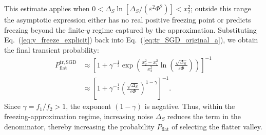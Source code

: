 \documentclass[aps,prx,reprint,superscriptaddress,longbibliography,nofootinbib,floatfix]{revtex4-2}
\begin{document}
This estimate applies when $0<\Delta_S \ln[\Delta_S/(\varepsilon^2\Phi^2)]<x_2^2$; outside this range the asymptotic expression either has no real positive freezing point or predicts freezing beyond the finite-$y$ regime captured by the approximation.
Substituting Eq.~(\ref{eq:y_freeze_explicit}) back into Eq.~(\ref{eq:tr_SGD_original_a}), we obtain the final transient probability:
\begin{equation}
\label{eq:final_ptr_corrected}
\begin{split}
    P_{\mathrm{flat}}^{\mathrm{tr,SGD}} 
    &\approx  \left[1+\gamma^{-\frac{1}{2}} \exp\!\left(\frac{x_2^2-x_1^2}{x_2^2} \ln\left( \frac{\sqrt{\Delta_S}}{\varepsilon \Phi} \right)\right)\right]^{-1} \\
    &\approx \left[ 1 + \gamma^{-\frac{1}{2}} \left( \frac{\sqrt{\Delta_S}}{\varepsilon \Phi} \right)^{1-\gamma} \right]^{-1}.
\end{split}
\end{equation}
Since $\gamma = f_1/f_2 > 1$, the exponent $(1-\gamma)$ is negative. Thus, within the freezing-approximation regime, increasing noise $\Delta_S$ reduces the term in the denominator, thereby increasing the probability $P_{\mathrm{flat}}$ of selecting the flatter valley.



\end{document}
